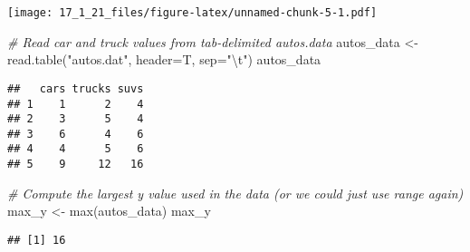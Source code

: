 \documentclass[
]{article}
\newenvironment{Shaded}{\begin{snugshade}}{\end{snugshade}}
\newcommand{\AttributeTok}[1]{\textcolor[rgb]{0.77,0.63,0.00}{#1}}
\newcommand{\CommentTok}[1]{\textcolor[rgb]{0.56,0.35,0.01}{\textit{#1}}}
\newcommand{\FunctionTok}[1]{\textcolor[rgb]{0.00,0.00,0.00}{#1}}
\newcommand{\NormalTok}[1]{#1}
\newcommand{\OtherTok}[1]{\textcolor[rgb]{0.56,0.35,0.01}{#1}}
\newcommand{\SpecialCharTok}[1]{\textcolor[rgb]{0.00,0.00,0.00}{#1}}
\newcommand{\StringTok}[1]{\textcolor[rgb]{0.31,0.60,0.02}{#1}}
\begin{document}
\texttt{[image: 17\_1\_21\_files/figure-latex/unnamed-chunk-5-1.pdf]}

\begin{Shaded}
\begin{Highlighting}[]
\CommentTok{\# Read car and truck values from tab{-}delimited autos.data}
\NormalTok{autos\_data }\OtherTok{\textless{}{-}} \FunctionTok{read.table}\NormalTok{(}\StringTok{"autos.dat"}\NormalTok{, }\AttributeTok{header=}\NormalTok{T, }\AttributeTok{sep=}\StringTok{"}\SpecialCharTok{\textbackslash{}t}\StringTok{"}\NormalTok{)}
\NormalTok{autos\_data}
\end{Highlighting}
\end{Shaded}

\begin{verbatim}
##   cars trucks suvs
## 1    1      2    4
## 2    3      5    4
## 3    6      4    6
## 4    4      5    6
## 5    9     12   16
\end{verbatim}

\begin{Shaded}
\begin{Highlighting}[]
\CommentTok{\# Compute the largest y value used in the data (or we could just use range again)}
\NormalTok{max\_y }\OtherTok{\textless{}{-}} \FunctionTok{max}\NormalTok{(autos\_data)}
\NormalTok{max\_y}
\end{Highlighting}
\end{Shaded}

\begin{verbatim}
## [1] 16
\end{verbatim}
\end{document}
